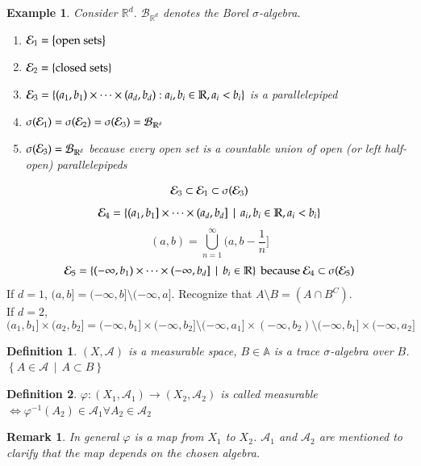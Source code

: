 \documentclass[a4paper]{article}
\numberwithin{lecref}{section}
\theoremstyle{break}
\newtheorem*{Example}{Example}
\newtheorem*{Definition}{Definition}
\newtheorem*{Remark}{Remark}
\newcommand{\Set}[1]{\left\{#1\right\}}
\newcommand{\SetDef}[2]{\left\{#1\,\mid\,#2\right\}}
\begin{document}
\begin{Example}
  Consider $\mathbb R^d$. $\mathcal B_{\mathbb R^d}$ denotes the Borel $\sigma$-algebra.
  \begin{enumerate}
    \item $\gen_1 = \Set{\text{open sets}}$
    \item $\gen_2 = \Set{\text{closed sets}}$
    \item $\gen_3 = \Set{(a_1, b_1) \times \dots \times (a_d, b_d): a_i, b_i \in \mathbb R, a_i < b_i}$ is a parallelepiped
    \item $\sigma({\mathcal E}_1) = \sigma({\mathcal E}_2) = \sigma({\mathcal E}_3) = \mathcal B_{\mathbb R^d}$
    \item $\sigma({\mathcal E}_3) = \mathcal B_{\mathbb R^d}$ because every open set is a countable union of open (or left half-open) parallelepipeds
  \end{enumerate}
\end{Example}
\[ {\mathcal E}_3 \subset {\mathcal E}_1 \subset \sigma({\mathcal E}_3) \]
\[ \gen_4 = \SetDef{(a_1, b_1] \times \dots \times (a_d, b_d]}{a_i, b_i \in \mathbb R, a_i < b_i} \]
\[ (a, b) = \bigcup_{n=1}^\infty (a, b - \frac1n] \]
\[ \gen_5 = \SetDef{(-\infty, b_1) \times \dots \times (-\infty, b_d]}{b_i \in \mathbb R} \text{ because } \gen_4 \subset \sigma(\gen_5) \]
If $d=1$, $(a, b] = (-\infty, b] \setminus (-\infty, a]$. Recognize that $A \setminus B = (A \cap B^C)$. \\
If $d=2$,
\[ (a_1, b_1] \times (a_2, b_2] = (-\infty, b_1] \times (-\infty, b_2] \setminus (-\infty, a_1] \times (-\infty, b_2) \setminus (-\infty, b_1] \times (-\infty, a_2] \]

\begin{Definition}
  $(X, \mathcal A)$ is a measurable space, $B \in \mathbb A$ is a trace $\sigma$-algebra over $B$. $\SetDef{A \in \mathcal A}{A \subset B}$
\end{Definition}

\begin{Definition}
  $\varphi: (X_1, \mathcal A_1) \to (X_2, \mathcal A_2)$ is called measurable
  $\iff \varphi^{-1}(A_2) \in \mathcal A_1 \forall A_2 \in \mathcal A_2$
\end{Definition}

\begin{Remark}
  In general $\varphi$ is a map from $X_1$ to $X_2$.
  $\mathcal A_1$ and $\mathcal A_2$ are mentioned to clarify that the map depends on the chosen algebra.
\end{Remark}
\end{document}
